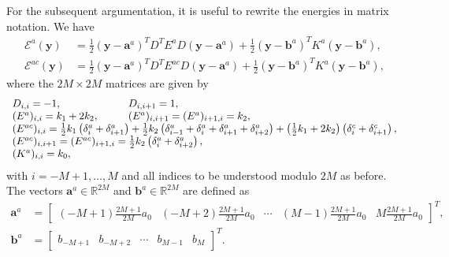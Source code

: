 \documentclass[11pt,reqno,oneside]{amsart}
\numberwithin{equation}{section}
\begin{document}
For the subsequent argumentation, it is useful to rewrite the energies in matrix
notation. We have
\begin{equation}
\begin{split}
{\mathcal{E}}^a({\mathbf{y}})   & = {{\textstyle \frac{1}{2}}} ({\mathbf{y}}-{\mathbf{a}}^a)^T D^T E^a D ({\mathbf{y}}-{\mathbf{a}}^a)
 + {{\textstyle \frac{1}{2}}} ({\mathbf{y}}-{\mathbf{b}}^a)^T K^a ({\mathbf{y}}-{\mathbf{b}}^a), \\
{\mathcal{E}}^{ac}({\mathbf{y}}) & = {{\textstyle \frac{1}{2}}} ({\mathbf{y}}-{\mathbf{a}}^a)^T D^T E^{ac} D ({\mathbf{y}}-{\mathbf{a}}^a)
 + {{\textstyle \frac{1}{2}}} ({\mathbf{y}}-{\mathbf{b}}^a)^T K^a ({\mathbf{y}}-{\mathbf{b}}^a),
\end{split}
\end{equation}
where the $2M\times 2M$ matrices are given by
\begin{equation}
\begin{array}{ll}
  D_{i,i} = -1, &
  D_{i,i+1} = 1, \\
  (E^a)_{i,i} = k_1 + 2 k_2, \qquad &
  (E^a)_{i,i+1} = (E^a)_{i+1,i} = k_2, \\
  \multicolumn{2}{l}{(E^{ac})_{i,i}
  = {{\textstyle \frac{1}{2}}} k_1 \left( \delta^a_i + \delta^a_{i+1} \right)
  + {{\textstyle \frac{1}{2}}} k_2 \left( \delta^a_{i-1} + \delta^a_{i} + \delta^a_{i+1} + \delta^a_{i+2} \right)
  + \left( {{\textstyle \frac{1}{2}}} k_1 + 2 k_2 \right) \left( \delta^c_i + \delta^c_{i+1} \right),} \\
  \multicolumn{2}{l}{(E^{ac})_{i,i+1} = (E^{ac})_{i+1,i}
  = {{\textstyle \frac{1}{2}}} k_2 \left( \delta^a_i + \delta^a_{i+2} \right),} \\
  (K^a)_{i,i} = k_0,
\end{array}
\end{equation}
with $i=-M+1, \ldots, M$ and all indices to be understood modulo $2M$ as before.
The vectors ${\mathbf{a}}^a\in{{\mathbb R}}^{2M}$ and  ${\mathbf{b}}^a\in{{\mathbb R}}^{2M}$ are defined as
\begin{equation}
\begin{split}
  {\mathbf{a}}^a & =
  \begin{bmatrix} (-M+1) {\textstyle \frac{2M+1}{2M}} a_0 &
                  (-M+2) {\textstyle \frac{2M+1}{2M}} a_0 &
                  \cdots &
                  ( M-1) {\textstyle \frac{2M+1}{2M}} a_0 &
                    M    {\textstyle \frac{2M+1}{2M}} a_0 \end{bmatrix}^T, \\
  {\mathbf{b}}^a & =
  \begin{bmatrix} b_{-M+1} & b_{-M+2} & \cdots & b_{M-1} & b_M \end{bmatrix}^T.
\end{split}
\end{equation}
\end{document}
